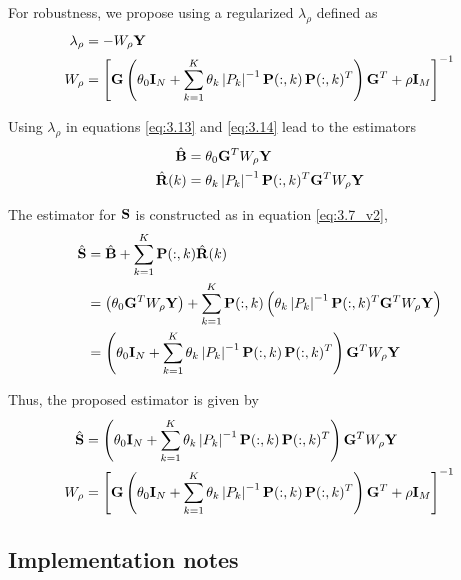 For robustness, we propose using a regularized $\lambda_\rho$ defined as
\begin{align}
    \lambda_\rho &= -W_\rho  \mathbf{Y} 
    \\
    W_\rho &=
    \left[ \mathbf{G} \left(  \theta_0 \mathbf{I}_N + \sum_{k=1}^K \theta_k \left| {P_k} \right|^{-1} 
    \mathbf{P}(:,k)\, \mathbf{P}(:,k)^T
     \right) \mathbf{G}^T + \rho \mathbf{I}_M  \right]^{-1}
\end{align}

Using $\lambda_\rho$ in equations \eqref{eq:3.13} and \eqref{eq:3.14} lead to the estimators
\begin{align}
    \hat{\mathbf{B}} &=
    \theta_0 \mathbf{G}^T W_\rho \mathbf{Y}
    \\
    \hat{\mathbf{R}}(k) &=
    \theta_k \left| {P_k} \right|^{-1} \mathbf{P}(:,k)^T \mathbf{G}^T W_\rho \mathbf{Y}
\end{align}

The estimator for $\mathbf{S}$ is constructed as in equation \eqref{eq:3.7_v2},
\begin{align}
    \hat{\mathbf{S}}
    &=
    \hat{\mathbf{B}} + \sum_{k=1}^K \mathbf{P}(:,k) \hat{\mathbf{R}}(k)
    \nonumber \\
    &=
    \left( \theta_0 \mathbf{G}^T W_\rho \mathbf{Y} \right)
    + \sum_{k=1}^K \mathbf{P}(:,k) \left( \theta_k \left| {P_k} \right|^{-1} \mathbf{P}(:,k)^T \mathbf{G}^T W_\rho \mathbf{Y} \right)
    \nonumber \\
    &=
    \left(  \theta_0 \mathbf{I}_N + \sum_{k=1}^K \theta_k \left| {P_k} \right|^{-1} 
    \mathbf{P}(:,k)\, \mathbf{P}(:,k)^T
     \right) \mathbf{G}^T W_\rho \mathbf{Y}
\end{align}

Thus, the proposed estimator is given by
\begin{align}
    \hat{\mathbf{S}}
    &=
    \left(  \theta_0 \mathbf{I}_N + \sum_{k=1}^K \theta_k \left| {P_k} \right|^{-1} 
    \mathbf{P}(:,k)\, \mathbf{P}(:,k)^T
     \right) \mathbf{G}^T W_\rho \mathbf{Y}
    \label{eq:3.24}
    \\
    W_\rho &=
    \left[ \mathbf{G} \left(  \theta_0 \mathbf{I}_N + \sum_{k=1}^K \theta_k \left| {P_k} \right|^{-1} 
    \mathbf{P}(:,k)\, \mathbf{P}(:,k)^T
     \right) \mathbf{G}^T + \rho \mathbf{I}_M  \right]^{-1}
    \label{eq:3.25}
\end{align}

\subsection{Implementation notes}

